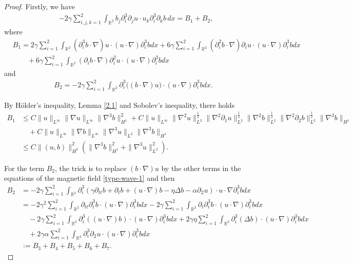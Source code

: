 \documentclass[reqno,11pt]{amsart}
\def\R{\mathbb R}
\numberwithin{Thm}{section}
\begin{document}
\begin{proof}
\par Firstly, we have
 \begin{align}\label{BBBB}
&-2\gamma\sum_{i,j,k=1}^2\int_{\mathbb{R}^2}
b_j\partial_i^3\partial_j u\cdot u_k\partial_i^3\partial_k b\,dx=B_{1}+B_{2},
\end{align}
where
 \begin{align*}
&B_1=2\gamma\sum_{i=1}^2\int_{\R^2}(\partial_i^3 b\cdot\nabla) u\cdot (u\cdot \nabla)\partial_i^3bdx+6\gamma\sum_{i=1}^2\int_{\R^2}(\partial_i^2 b\cdot\nabla)\partial_i u\cdot (u\cdot \nabla)\partial_i^3b dx\nonumber\\&\qquad+6\gamma\sum_{i=1}^2\int_{\R^2}(\partial_i b\cdot\nabla)\partial_i^2 u\cdot (u\cdot \nabla)\partial_i^3b dx
\end{align*}
and
 \begin{align*}
B_2=-2\gamma\sum_{i=1}^2\int_{\R^2}\partial_i^3\big((b\cdot\nabla) u\big)\cdot (u\cdot\nabla)\partial_i^3 bdx.
\end{align*}

By H\"{o}lder's inequality, Lemma \ref{2.1} and Sobolev's inequality, there holds
\begin{align}\label{A7}
B_{1}
&\leq
C\|u\|_{L^{\infty}}\|\nabla u\|_{L^{\infty}}\|\nabla^3b\|_{H^1}^2+C\|u\|_{L^{\infty}}\|\nabla ^2u\|_{L^{2}}^{\frac{1}{2}}\|\nabla ^2\partial_1u\|_{L^{2}}^{\frac{1}{2}}\|\nabla ^2b\|_{L^{2}}^{\frac{1}{2}}\|\nabla ^2\partial_2b\|_{L^{2}}^{\frac{1}{2}}\|\nabla^3b\|_{H^1}\nonumber\\
&\quad+C\|u\|_{L^{\infty}}\|\nabla b\|_{L^{\infty}}\|\nabla^3u\|_{L^2}\|\nabla^3b\|_{H^1}\nonumber\\
&\leq
C\|(u,b)\|_{H^{3}}^2(\|\nabla^3b\|_{H^1}^2+\|\nabla^3u\|_{L^2}^2).
\end{align}




For the  term  $B_{2}$, the trick is to replace $(b\cdot\nabla)u$ by the other terms in the equations of the magnetic field \eqref{type-wave-1} and then
\begin{align}\label{A21}
B_{2}&=-2\gamma\sum_{i=1}^2\int_{\R^2}\partial_i^3(\gamma\partial_{tt}b+\partial_{t}b+(u\cdot\nabla) b-\eta\Delta b-\alpha\partial_2u)\cdot u\cdot\nabla\partial_i^3 bdx\nonumber\\
&=-2\gamma^2\sum_{i=1}^2\int_{\R^2}\partial_{tt}\partial_i^3b\cdot (u\cdot\nabla)\partial_i^3 bdx-2\gamma\sum_{i=1}^2\int_{\R^2}\partial_{t}\partial_i^3b\cdot (u\cdot\nabla)\partial_i^3 bdx\nonumber\\
&\quad-2\gamma\sum_{i=1}^2\int_{\R^2}\partial_i^3((u\cdot\nabla) b)\cdot (u\cdot\nabla)\partial_i^3 bdx+2\gamma\eta\sum_{i=1}^2\int_{\R^2}\partial_i^3(\Delta b)\cdot (u\cdot\nabla)\partial_i^3 bdx\nonumber\\
&\quad+2\gamma\alpha\sum_{i=1}^2\int_{\R^2}\partial_i^3\partial_2u\cdot (u\cdot\nabla)\partial_i^3 bdx\nonumber\\
&:=B_{3}+B_{4}+B_{5}+B_{6}+B_{7}.
\end{align}


\end{proof}
\end{document}
